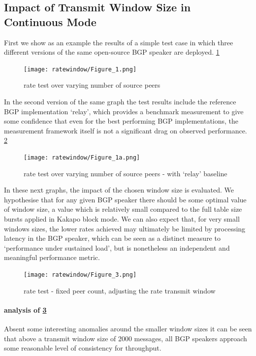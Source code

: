\subsection{Impact of Transmit Window Size in Continuous Mode}
First we show as an example the results of a simple test case in which three different versions of the same open-source BGP speaker are deployed.
\ref{fig:rw_fig1}

\begin{figure}[H]
    \centering
    \texttt{[image: ratewindow/Figure\_1.png]}
    \caption{rate test over varying number of source peers}
    \label{fig:rw_fig1}
\end{figure}

In the second version of the same graph the test results include the reference BGP implementation ‘relay’, which provides a benchmark measurement to give some confidence that even for the best performing BGP implementations, the measurement framework itself is not a significant drag on observed performance.
\ref{fig:rw_fig1a}

\begin{figure}[H]
    \centering
    \texttt{[image: ratewindow/Figure\_1a.png]}
    \caption{rate test over varying number of source peers - with `relay' baseline}
    \label{fig:rw_fig1a}
\end{figure}

In these next graphs, the impact of the chosen window size is evaluated.
We hypothesise that for any given BGP speaker there should be some optimal value of window size, a value which is relatively small compared to the full table size bursts applied in Kakapo block mode.
We can also expect that, for very small windows sizes, the lower rates achieved may ultimately be limited by processing latency in the BGP speaker, which can be seen as a distinct measure to `performance under sustained load', but is nonetheless an independent and meaningful performance metric.

\begin{figure}[H]
    \centering
    \texttt{[image: ratewindow/Figure\_3.png]}
    \caption{rate test - fixed peer count, adjusting the rate transmit window }
    \label{fig:rw_fig3}
\end{figure}

\paragraph{analysis of \ref{fig:rw_fig3}}
Absent some interesting anomalies around the smaller window sizes it can be seen that above a transmit window size of 2000 messages, all BGP speakers approach some reasonable level of consistency for throughput.

